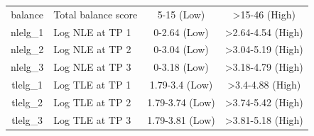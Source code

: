\documentclass[
  english,
  man,floatsintext]{apa6}
\begin{document}
\begin{longtable}[t]{c>{\raggedright\arraybackslash}p{5cm}cc}
balance & Total balance score & 5-15 (Low) & >15-46 (High)\\
nlelg\_1 & Log NLE at TP 1 & 0-2.64 (Low) & >2.64-4.54 (High)\\
nlelg\_2 & Log NLE at TP 2 & 0-3.04 (Low) & >3.04-5.19 (High)\\
nlelg\_3 & Log NLE at TP 3 & 0-3.18 (Low) & >3.18-4.79 (High)\\
tlelg\_1 & Log TLE at TP 1 & 1.79-3.4 (Low) & >3.4-4.88 (High)\\
tlelg\_2 & Log TLE at TP 2 & 1.79-3.74 (Low) & >3.74-5.42 (High)\\
tlelg\_3 & Log TLE at TP 3 & 1.79-3.81 (Low) & >3.81-5.18 (High)\\
\bottomrule
\end{longtable}

\begin{center}
\begin{ThreePartTable}


\end{ThreePartTable}
\end{center}
\end{document}
